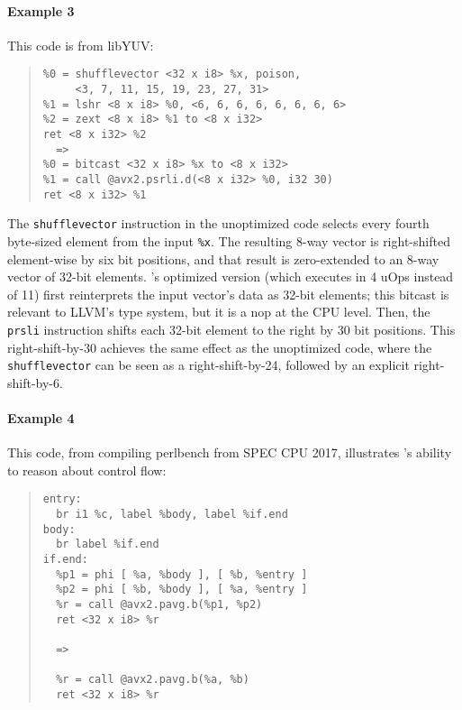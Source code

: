 \newpage
\paragraph{Example 3}

This code is from libYUV:

{\small\begin{quote}\begin{verbatim}
%0 = shufflevector <32 x i8> %x, poison,
     <3, 7, 11, 15, 19, 23, 27, 31>
%1 = lshr <8 x i8> %0, <6, 6, 6, 6, 6, 6, 6, 6>
%2 = zext <8 x i8> %1 to <8 x i32>
ret <8 x i32> %2
  =>
%0 = bitcast <32 x i8> %x to <8 x i32>
%1 = call @avx2.psrli.d(<8 x i32> %0, i32 30)
ret <8 x i32> %1
\end{verbatim}
\end{quote}}

The \texttt{shufflevector} instruction in the unoptimized code selects
every fourth byte-sized element from the input \texttt{\%x}.
%
The resulting 8-way vector is right-shifted element-wise by six bit
positions, and that result is zero-extended to an 8-way vector of
32-bit elements.
%
\tool's optimized version (which executes in 4 uOps instead of 11)
first reinterprets the input vector's data as 32-bit elements; this
bitcast is relevant to LLVM's type system, but it is a nop at the CPU
level.
%
Then, the \texttt{prsli} instruction shifts each 32-bit element to the
right by 30 bit positions.
%
This right-shift-by-30 achieves the same effect as the unoptimized
code, where the \texttt{shufflevector} can be seen as a
right-shift-by-24, followed by an explicit right-shift-by-6.

\paragraph{Example 4}

This code, from compiling perlbench from SPEC CPU 2017, illustrates
\tool's ability to reason about control flow:

{\small\begin{quote}\begin{verbatim}
entry:
  br i1 %c, label %body, label %if.end
body:
  br label %if.end
if.end:
  %p1 = phi [ %a, %body ], [ %b, %entry ]
  %p2 = phi [ %b, %body ], [ %a, %entry ]
  %r = call @avx2.pavg.b(%p1, %p2)
  ret <32 x i8> %r

  =>

  %r = call @avx2.pavg.b(%a, %b)
  ret <32 x i8> %r
\end{verbatim}
\end{quote}}

